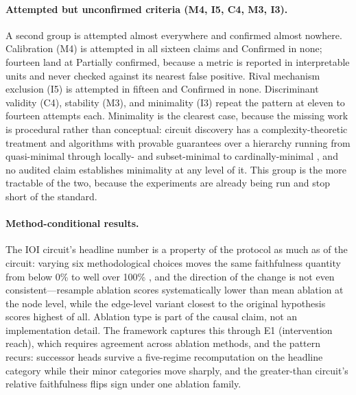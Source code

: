 \documentclass{article}
\begin{document}
\paragraph{Attempted but unconfirmed criteria (M4, I5, C4, M3, I3).} A second group is attempted almost everywhere and confirmed almost nowhere. Calibration (M4) is attempted in all sixteen claims and Confirmed in none; fourteen land at Partially confirmed, because a metric is reported in interpretable units and never checked against its nearest false positive. Rival mechanism exclusion (I5) is attempted in fifteen and Confirmed in none. Discriminant validity (C4), stability (M3), and minimality (I3) repeat the pattern at eleven to fourteen attempts each. Minimality is the clearest case, because the missing work is procedural rather than conceptual: circuit discovery has a complexity-theoretic treatment \citep{adolfi2025complexity} and algorithms with provable guarantees over a hierarchy running from quasi-minimal through locally- and subset-minimal to cardinally-minimal \citep{hadad2026formal}, and no audited claim establishes minimality at any level of it. This group is the more tractable of the two, because the experiments are already being run and stop short of the standard.

\paragraph{Method-conditional results.} The IOI circuit's headline number is a property of the protocol as much as of the circuit: varying six methodological choices moves the same faithfulness quantity from below 0\% to well over 100\% \citep{miller2024transformer}, and the direction of the change is not even consistent---resample ablation scores systematically lower than mean ablation at the node level, while the edge-level variant closest to the original hypothesis scores highest of all. Ablation type is part of the causal claim, not an implementation detail. The framework captures this through E1 (intervention reach), which requires agreement across ablation methods, and the pattern recurs: successor heads survive a five-regime recomputation on the headline category while their minor categories move sharply, and the greater-than circuit's relative faithfulness flips sign under one ablation family.
\end{document}
